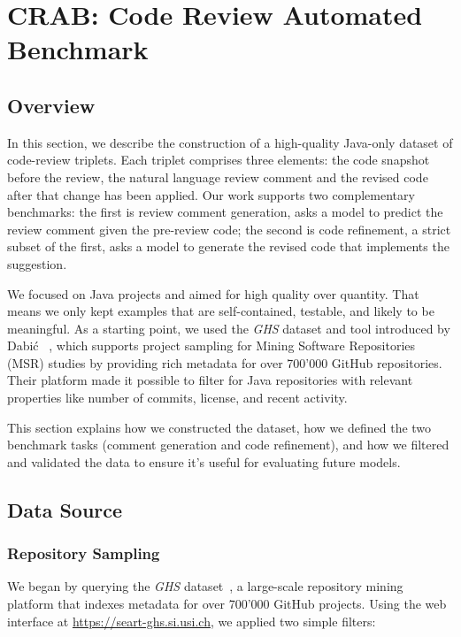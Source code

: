 \section{CRAB: Code Review Automated Benchmark}

\subsection{Overview}

In this section, we describe the construction of a high-quality Java-only dataset of code-review
triplets. Each triplet comprises three elements: the code snapshot before the review, the natural
language review comment and the revised code after that change has been applied. Our work supports
two complementary benchmarks: the first is review comment generation, asks a model to predict the
review comment given the pre-review code; the second is code refinement, a strict subset of the
first, asks a model to generate the revised code that implements the suggestion.


We focused on Java projects and aimed for high quality over quantity. That means we only kept
examples that are self-contained, testable, and likely to be meaningful. As a starting point, we
used the \textit{GHS} dataset and tool introduced by Dabić \etal~\cite{Dabic:msr2021data}, which
supports project sampling for Mining Software Repositories (MSR) studies by providing rich metadata
for over 700'000 GitHub repositories. Their platform made it possible to filter for Java
repositories with relevant properties like number of commits, license, and recent activity.

This section explains how we constructed the dataset, how we defined the two benchmark tasks
(comment generation and code refinement), and how we filtered and validated the data to ensure it’s
useful for evaluating future models.


\subsection{Data Source}

\subsubsection{Repository Sampling}

We began by querying the \textit{GHS} dataset~\cite{Dabic:msr2021data}, a large-scale repository
mining platform that indexes metadata for over 700'000 GitHub projects. Using the web interface at
\url{https://seart-ghs.si.usi.ch}, we applied two simple filters:

